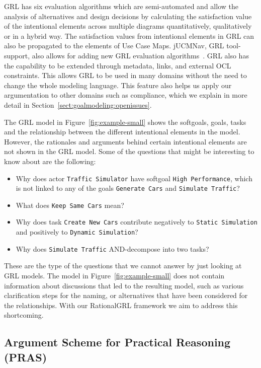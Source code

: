 GRL has six evaluation algorithms which are semi-automated and allow the analysis of alternatives and design decisions by calculating the satisfaction value of the intentional elements across multiple diagrams quantitatively, qualitatively or in a hybrid way. The satisfaction values from intentional elements in GRL can also be propagated to the elements of Use Case Maps.  jUCMNav, GRL tool-support, also allows for adding new GRL evaluation algorithms~\cite{jUCMNav}. GRL also has the capability to be extended through metadata, links, and external OCL constraints. This allows GRL to be used in many domains without the need to change the whole modeling language. This feature also helps us apply our argumentation to other domains such as compliance, which we explain in more detail in Section~\ref{sect:goalmodeling:openissues}.

The GRL model in Figure~\ref{fig:example-small} shows the softgoals, goals, tasks and the relationship between the different intentional elements in the model. However, the rationales and arguments behind certain intentional elements are not shown in the GRL model. Some of the questions that might be interesting to know about are the following:

\begin{itemize}
	\item Why does actor \texttt{Traffic Simulator} have softgoal \texttt{High Performance}, which is not linked to any of the goals \texttt{Generate Cars} and \texttt{Simulate Traffic}? %
	\item What does \texttt{Keep Same Cars} mean?
	\item Why does task \texttt{Create New Cars} contribute negatively to \texttt{Static Simulation} and positively to \texttt{Dynamic Simulation}?
	\item Why does \texttt{Simulate Traffic} AND-decompose into two tasks?
\end{itemize}

These are the type of the questions that we cannot answer by just looking at GRL models. The model in Figure~\ref{fig:example-small} does not contain information about discussions that led to the resulting model, such as various clarification steps for the naming, or alternatives that have been considered for the relationships. With our RationalGRL framework we aim to address this shortcoming.

\subsection{Argument Scheme for Practical Reasoning (PRAS)}
\label{sect:background:pras}

